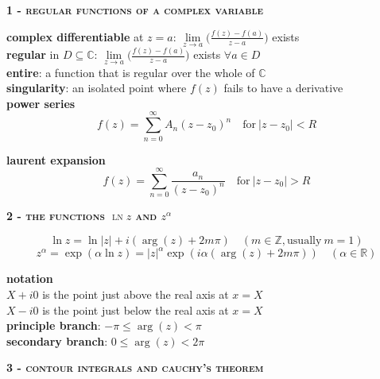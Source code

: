 \documentclass[a4paper]{article}
\newcommand\abs[1]{\ensuremath{\lvert#1\rvert}}
\begin{document}
\begin{multicols}{2}
\begin{framed}
	\begin{center}
		\textbf{\textsc{1 - regular functions of a complex variable}}
	\end{center}
	
	\noindent
	\textbf{complex differentiable} at $z = a$: $\lim\limits_{z \rightarrow a}\Big(\frac{f(z)-f(a)}{z-a}\Big)$ exists\\
	
	\noindent
	\textbf{regular} in $D \subseteq \mathbb{C}$: $\lim\limits_{z \rightarrow a}\Big(\frac{f(z)-f(a)}{z-a}\Big)$ exists $\forall a \in D$\\
	
	\noindent
	\textbf{entire}: a function that is regular over the whole of $\mathbb{C}$\\
	
	\noindent
	\textbf{singularity}: an isolated point where $f(z)$ fails to have a derivative\\
	
	\noindent
	\textbf{power series}\\
	$$f(z) = \sum\limits_{n=0}^{\infty} A_n(z - z_0)^n \quad \text{for} \ \abs{z - z_0} < R$$
	
	\noindent
	\textbf{laurent expansion}
	$$f(z) = \sum\limits_{n=0}^{\infty}\frac{a_n}{(z-z_0)^n} \quad \text{for} \ \abs{z - z_0} > R$$
\end{framed}

\begin{framed}
	\begin{center}
		\textbf{\textsc{2 - the functions $\ln z$ and $z^\alpha$}}
	\end{center}
	
	\noindent
	$$\ln z = \ln \abs{z} + i (\arg(z) + 2m\pi) \quad (m \in \mathbb{Z}, \text{usually} \ m = 1)$$
	$$z^\alpha = \exp(\alpha \ln z) = \abs{z}^\alpha \exp(i\alpha(\arg(z) + 2m\pi)) \quad (\alpha \in \mathbb{R})$$
	
	\noindent
	\textbf{notation}\\
	$X + i0$ is the point just above the real axis at $x = X$\\
	$X - i0$ is the point just below the real axis at $x = X$\\
	
	\noindent
	\textbf{principle branch}: $-\pi \leq \arg(z) < \pi$\\
	\textbf{secondary branch}: $0 \leq \arg(z) < 2\pi$
\end{framed}

\begin{framed}
	\begin{center}
		\textbf{\textsc{3 - contour integrals and cauchy's theorem}}
	\end{center}
	

\end{framed}
\end{multicols}
\end{document}
